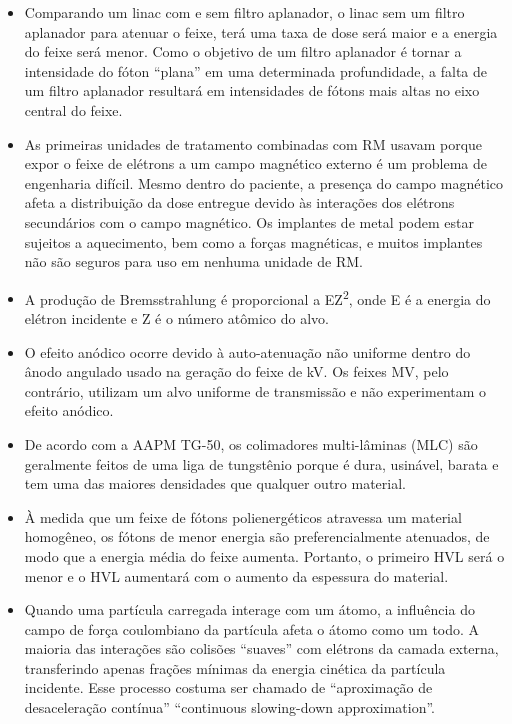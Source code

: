 \documentclass[11pt,a4paper]{article}
\newcounter{exemplo}
\begin{document}
\begin{exemplo}[Física]
\begin{itemize}
        \item Comparando um linac com e sem filtro aplanador, o linac sem um filtro aplanador para atenuar o feixe, terá uma taxa de dose será maior e a energia do feixe será menor. Como o objetivo de um filtro aplanador é tornar a intensidade do fóton “plana” em uma determinada profundidade, a falta de um filtro aplanador resultará em intensidades de fótons mais altas no eixo central do feixe.
        
        \item As primeiras unidades de tratamento combinadas com RM usavam  porque expor o feixe de elétrons a um campo magnético externo é um problema de engenharia difícil. Mesmo dentro do paciente, a presença do campo magnético afeta a distribuição da dose entregue devido às interações dos elétrons secundários com o campo magnético. Os implantes de metal podem estar sujeitos a aquecimento, bem como a forças magnéticas, e muitos implantes não são seguros para uso em nenhuma unidade de RM.
        
        \item A produção de Bremsstrahlung é proporcional a EZ\textsuperscript{2}, onde E é a energia do elétron incidente e Z é o número atômico do alvo.
        
        \item O efeito anódico ocorre devido à auto-atenuação não uniforme dentro do ânodo angulado usado na geração do feixe de kV. Os feixes MV, pelo contrário, utilizam um alvo uniforme de transmissão e não experimentam o efeito anódico.
        
        \item De acordo com a AAPM TG-50, os colimadores multi-lâminas (MLC) são geralmente feitos de uma liga de tungstênio porque é dura, usinável, barata e tem uma das maiores densidades que qualquer outro material.
        
        \item À medida que um feixe de fótons polienergéticos atravessa um material homogêneo, os fótons de menor energia são preferencialmente atenuados, de modo que a energia média do feixe aumenta. Portanto, o primeiro HVL será o menor e o HVL aumentará com o aumento da espessura do material.
        
        \item Quando uma partícula carregada interage com um átomo, a influência do campo de força coulombiano da partícula afeta o átomo como um todo. A maioria das interações são colisões “suaves” com elétrons da camada externa, transferindo apenas frações mínimas da energia cinética da partícula incidente. Esse processo costuma ser chamado de “aproximação de desaceleração contínua” ``continuous slowing-down approximation''.
        

\end{itemize}
\end{exemplo}
\end{document}
